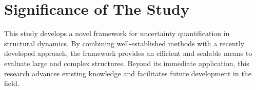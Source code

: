 %
%

\section{Significance of The Study}
\label{sec: significance}

This study develops a novel framework for uncertainty quantification in structural dynamics.
By combining well-established methods with a recently developed approach, the framework provides an efficient and scalable means to evaluate large and complex structures.
Beyond its immediate application, this research advances existing knowledge and facilitates future development in the field.